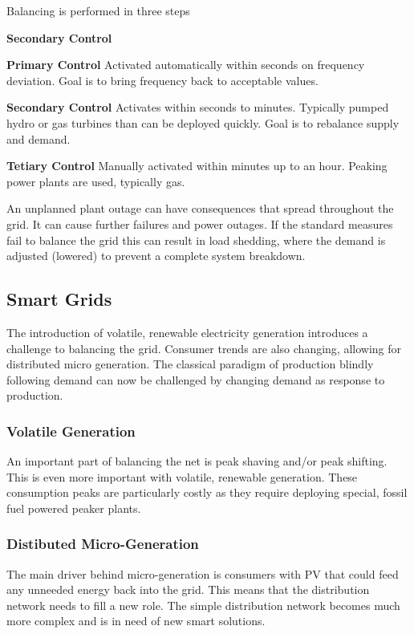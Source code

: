 Balancing is performed in three steps
\begin{labeling}{\textbf{Secondary Control}}
\item [\textbf{Primary Control}] Activated automatically within seconds on frequency deviation. Goal is to bring frequency back to acceptable values.
\item [\textbf{Secondary Control}] Activates within seconds to minutes. Typically pumped hydro or gas turbines than can be deployed quickly. Goal is to rebalance supply and demand.
\item [\textbf{Tetiary Control}] Manually activated within minutes up to an hour. Peaking power plants are used, typically gas.
\end{labeling}

An unplanned plant outage can have consequences that spread throughout the grid.
It can cause further failures and power outages.
If the standard measures fail to balance the grid this can result in load shedding, where the demand is adjusted (lowered) to prevent a complete system breakdown.

\subsection{Smart Grids}
The introduction of volatile, renewable electricity generation introduces a challenge to balancing the grid.
Consumer trends are also changing, allowing for distributed micro generation.
The classical paradigm of production blindly following demand can now be challenged by changing demand as response to production.

\subsubsection{Volatile Generation}
An important part of balancing the net is peak shaving and/or peak shifting.
This is even more important with volatile, renewable generation.
These consumption peaks are particularly costly as they require deploying special, fossil fuel powered peaker plants.

\subsubsection{Distibuted Micro-Generation}
The main driver behind micro-generation is consumers with PV that could feed any unneeded energy back into the grid.
This means that the distribution network needs to fill a new role.
The simple distribution network becomes much more complex and is in need of new smart solutions.

